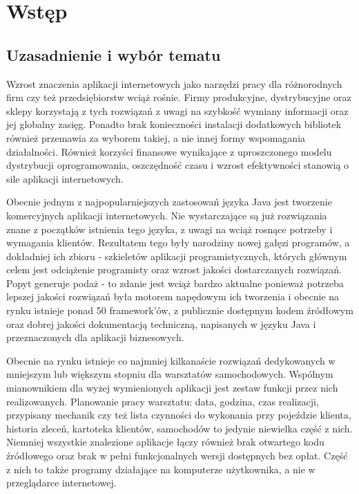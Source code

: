 \chapter{Wstęp}
\label{chaper:introduction}

\section{Uzasadnienie i wybór tematu}
	
	Wzrost znaczenia aplikacji internetowych jako narzędzi pracy dla różnorodnych firm czy też przedsiębiorstw wciąż rośnie. Firmy produkcyjne, dystrybucyjne oraz sklepy korzystają z tych rozwiązań z uwagi na szybkość wymiany informacji oraz jej globalny zasięg. Ponadto brak konieczności instalacji dodatkowych bibliotek również przemawia za wyborem takiej, a nie innej formy wspomagania działalności. Również korzyści finansowe wynikające z uproszczonego modelu dystrybucji oprogramowania, oszczędność czasu i wzrost efektywności stanowią o sile aplikacji internetowych.
	
	Obecnie jednym z najpopularniejszych zastosowań języka Java jest tworzenie komercyjnych aplikacji internetowych. Nie wystarczające są już rozwiązania znane z początków istnienia tego języka, z uwagi na wciąż rosnące potrzeby i wymagania klientów. Rezultatem tego były narodziny nowej gałęzi programów, a dokładniej ich zbioru - szkieletów aplikacji programistycznych, których głównym celem jest odciążenie programisty oraz wzrost jakości dostarczanych rozwiązań. Popyt generuje podaż - to zdanie jest wciąż bardzo aktualne ponieważ potrzeba lepszej jakości rozwiązań była motorem napędowym ich tworzenia i obecnie na rynku istnieje ponad 50 framework'ów, z publicznie dostępnym kodem źródłowym oraz dobrej jakości dokumentacją techniczną, napisanych w języku Java i przeznaczonych dla aplikacji biznesowych. 
	
	Obecnie na rynku istnieje co najmniej kilkanaście rozwiązań dedykowanych w mniejszym lub większym stopniu dla warsztatów samochodowych. Wspólnym mianownikiem dla wyżej wymienionych aplikacji jest zestaw funkcji przez nich realizowanych. Planowanie pracy warsztatu: data, godzina, czas realizacji, przypisany mechanik czy też lista czynności do wykonania przy pojeździe klienta, historia zleceń, kartoteka klientów, samochodów to jedynie niewielka część z nich. Niemniej wszystkie znalezione aplikacje łączy również brak otwartego kodu źródłowego oraz brak w pełni funkcjonalnych wersji dostępnych bez opłat. Część z nich to także programy działające na komputerze użytkownika, a nie w przeglądarce internetowej.
	
